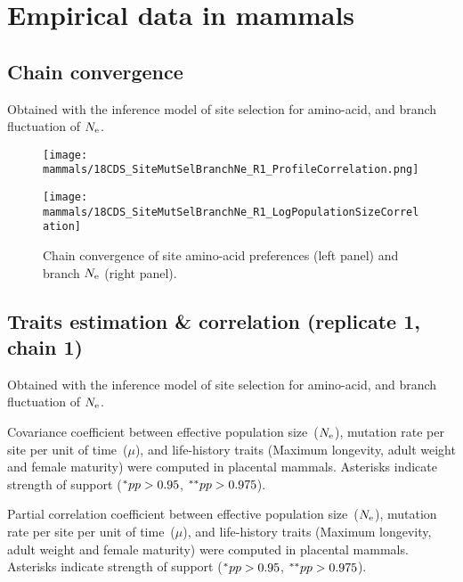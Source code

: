 \section{Empirical data in mammals}

\subsection{Chain convergence}
Obtained with the inference model of site selection for amino-acid, and branch fluctuation of $\Ne$.

\begin{figure}[H]
    \centering
    \begin{minipage}{0.49\linewidth}
        \texttt{[image: mammals/18CDS\_SiteMutSelBranchNe\_R1\_ProfileCorrelation.png]}
    \end{minipage} \hfill
    \begin{minipage}{0.49\linewidth}
        \texttt{[image: mammals/18CDS\_SiteMutSelBranchNe\_R1\_LogPopulationSizeCorrelation]}
    \end{minipage}
    \caption[Chain convergence of site profiles and branche $\Ne$]{
    Chain convergence of site amino-acid preferences (left panel) and branch $\Ne$ (right panel).}
\end{figure}

\subsection{Traits estimation \& correlation (replicate 1, chain 1)}
Obtained with the inference model of site selection for amino-acid, and branch fluctuation of $\Ne$.

\begin{table}[H]
    
    \caption[Covariance matrix in mammals]{
    Covariance coefficient between effective population size~($\Ne$), mutation rate per site per unit of time~($\mu$), and life-history traits (Maximum longevity, adult weight and female maturity) were computed in placental mammals.
    Asterisks indicate strength of support ($\smash{^{*}} pp > 0.95$, $\smash{^{**}} pp > 0.975$).}
\end{table}

\begin{table}[H]
    
    \caption[Partial correlation coefficient matrix in mammals]{
    Partial correlation coefficient between effective population size~($\Ne$), mutation rate per site per unit of time~($\mu$), and life-history traits (Maximum longevity, adult weight and female maturity) were computed in placental mammals.
    Asterisks indicate strength of support ($\smash{^{*}} pp > 0.95$, $\smash{^{**}} pp > 0.975$).}
\end{table}

